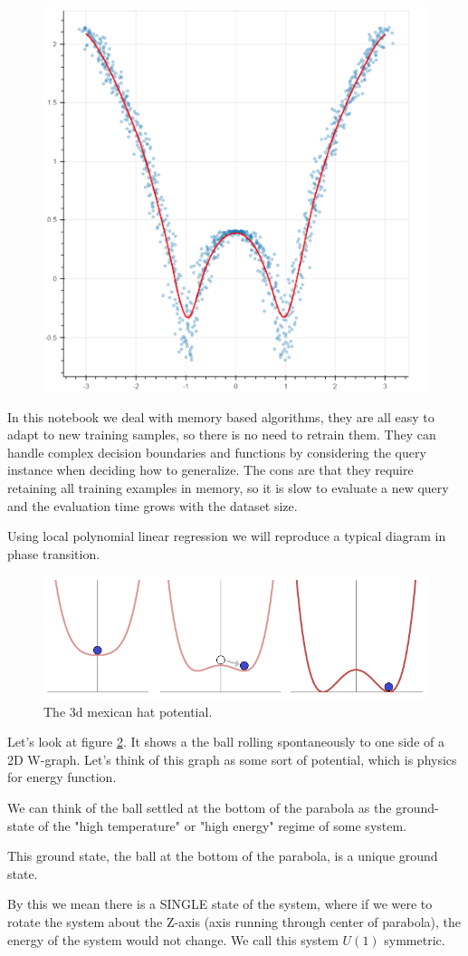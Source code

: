 \documentclass[11pt,letterpaper]{report}
\begin{document}
 \begin{figure}[h!]
 	\centering
 	\includegraphics[width=0.45\linewidth]{figures/bokeh_plot.png}
 	\caption{}
 	\label{fig:knn}
 \end{figure} 	
 In this notebook we deal with  memory based algorithms, 
 they are all easy to adapt to new training samples, so there is no need to retrain them. They 
 can handle complex decision boundaries and functions by considering the query instance when deciding how to generalize.
 The cons are that they require retaining all training examples in memory, so it is slow to evaluate a new query and the evaluation time grows with the dataset size.
  
Using local polynomial linear regression we will reproduce a typical diagram in phase transition.
 \begin{figure}[h!]
	\centering
	\includegraphics[width=0.45\linewidth]{figures/image.png}
	\caption{The 3d mexican hat potential.} 
	\label{fig:face}
\end{figure} 	
Let's look at figure \ref{fig:face}. It shows a the ball rolling spontaneously to one side of a 2D W-graph. Let's think of this graph as some sort of potential, which is physics for energy function.

We can think of the ball settled at the bottom of the parabola as the ground-state of the "high temperature" or "high energy" regime of some system. 

This ground state, the ball at the bottom of the parabola, is a unique ground state. 

By this we mean there is a SINGLE state of the system, where if we were to rotate the system about the Z-axis (axis running through center of parabola), the energy of the system would not change. We call this system $U(1)$ symmetric. 
\end{document}
